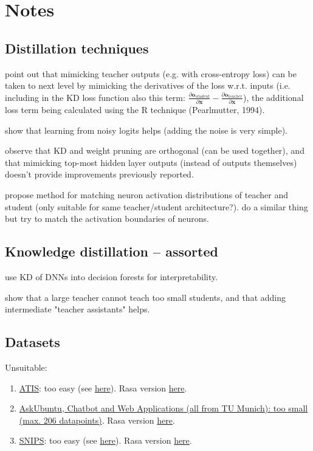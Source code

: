 \documentclass[bsc,frontabs,twoside,singlespacing,parskip,deptreport]{infthesis}
\begin{document}
\chapter{Notes}{
  \section{Distillation techniques}{
    \citet[p. 13]{Papamakarios-2015} point out that mimicking teacher outputs (e.g. with cross-entropy loss) can be taken to next level by mimicking the derivatives of the loss w.r.t. inputs (i.e. including in the KD loss function also this term: $\frac{\partial \mathbf{o}_{student}}{\partial \mathbf{x}} - \frac{\partial \mathbf{o}_{teacher}}{\partial \mathbf{x}}$), the additional loss term being calculated using the R technique (Pearlmutter, 1994).

    \citet{Sau-Balasubramanian-2016} show that learning from noisy logits helps (adding the noise is very simple).

    \citet{Kim-Rush-2016} observe that KD and weight pruning are orthogonal (can be used together), and that mimicking top-most hidden layer outputs (instead of outputs themselves) doesn't provide improvements previously reported.

    \citet{Huang-Wang-2017} propose method for matching neuron activation distributions of teacher and student (only suitable for same teacher/student architecture?). \citet{Heo-et-al-2018} do a similar thing but try to match the activation boundaries of neurons.
  }

  \section{Knowledge distillation -- assorted}{
    \citet{Zharov-et-al-2018} use KD of DNNs into decision forests for interpretability.

    \citet{Mirzadeh-et-al-2019} show that a large teacher cannot teach too small students, and that adding intermediate "teacher assistants" helps.
  }

  \section{Datasets}{
    Unsuitable:
    \begin{enumerate}
      \item \href{https://github.com/microsoft/CNTK/tree/master/Examples/LanguageUnderstanding/ATIS}{ATIS}: too easy (see \href{https://github.com/nghuyong/rasa-nlu-benchmark#result}{here}). Rasa version \href{https://github.com/nghuyong/rasa-nlu-benchmark}{here}.
      \item \href{https://github.com/sebischair/NLU-Evaluation-Corpora}{AskUbuntu, Chatbot and Web Applications (all from TU Munich): too small (max. 206 datapoints)}. Rasa version \href{https://github.com/nghuyong/rasa-nlu-benchmark}{here}.
      \item \href{https://github.com/snipsco/nlu-benchmark/tree/master/2016-12-built-in-intents}{SNIPS}: too easy (see \href{https://github.com/nghuyong/rasa-nlu-benchmark#result}{here}). Rasa version \href{https://github.com/nghuyong/rasa-nlu-benchmark}{here}.
    \end{enumerate}

}}
\end{document}
